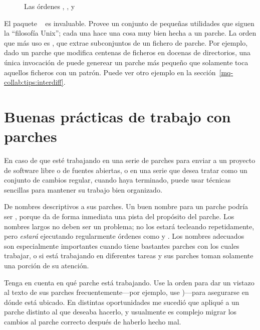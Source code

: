\begin{figure}[ht]
  \caption{Las órdenes , , y }
  \label{ex:mq:tools}
\end{figure}

El paquete ~\cite{web:patchutils} es
invaluable. Provee un conjunto de pequeñas utilidades que siguen la
``filosofía Unix''; cada una hace una cosa muy bien hecha a un
parche. La orden  que más uso es
, que extrae subconjuntos de un fichero de
parche.  Por ejemplo, dado un parche que modifica centenas de ficheros
en docenas de directorios, una única invocación de
 puede generear un parche más pequeño que
solamente toca aquellos ficheros con un patrón.  Puede ver otro
ejemplo en la sección~\ref{mq-collab:tips:interdiff}.

\section{Buenas prácticas de trabajo con parches}

En caso de que esté trabajando en una serie de parches para enviar a
un proyecto de software libre o de fuentes abiertas, o en una serie
que desea tratar como un conjunto de cambios regular, cuando haya
terminado, puede usar técnicas sencillas para mantener su trabajo bien
organizado.

De nombres descriptivos a sus parches.  Un buen nombre para un parche
podría ser , porque da de forma
inmediata una pista del propósito del parche. Los nombres largos no
deben ser un problema; no los estará tecleando repetidamente, pero
\emph{estará} ejecutando regularmente órdenes como
 y .  Los nombres adecuados son
especialmente importantes cuando tiene bastantes parches con los
cuales trabajar, o si está trabajando en diferentes tareas y sus
parches toman solamente una porción de su atención.

Tenga en cuenta en qué parche está trabajando.  Use la orden 
para dar un vistazo al texto de sus parches frecuentemente---por
ejemplo, use )---para asegurarse en
dónde está ubicado.  En distintas oportunidades me sucedió que apliqué
 a un parche distinto al que deseaba hacerlo, y
usualmente es complejo migrar los cambios al parche correcto después
de haberlo hecho mal.

